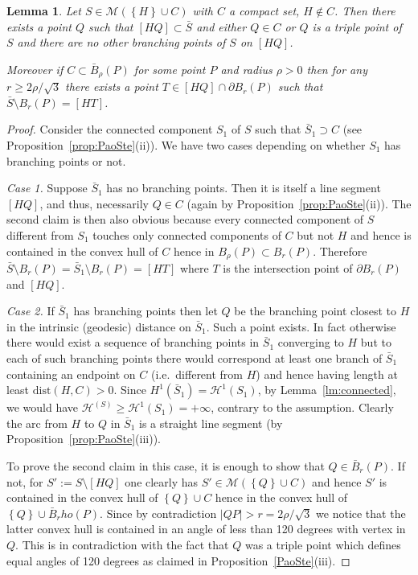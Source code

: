 \documentclass{article}
\renewcommand{\H}{\mathcal H}
\newcommand{\abs}[1]{\left\vert #1 \right\vert}
\newcommand{\ENCLOSE}[1]{\left\{#1\right\}}
\newcommand{\M}{\mathcal{M}}
\renewcommand{\H}{\mathcal{H}}
\newcommand{\dist}{\mathrm{dist}}
\newtheorem{lemma}[theorem]{Lemma}
\theoremstyle{definition}
\theoremstyle{remark}
\begin{document}
\begin{lemma}\label{lm:angle}
Let $S\in \M(\ENCLOSE{H} \cup C)$ with $C$ a compact set, $H\not \in C$.
Then there exists a point $Q$ such that $[HQ]\subset \bar S$ 
and either $Q\in C$ or $Q$ is a triple point of $S$
and there are no other branching points of $S$ on $[HQ]$.

Moreover if $C\subset \bar B_\rho(P)$ for some point $P$ and radius $\rho > 0$
then for any $r\ge 2\rho/\sqrt 3$ there exists a point 
$T\in [HQ]\cap \partial B_r(P)$ such that 
$\bar S\setminus B_r(P) = [HT]$.
\end{lemma}
%
\begin{proof}
Consider the connected component $S_1$ of $S$ such that $\bar S_1\supset C$
(see Proposition~\ref{prop:PaoSte}(ii)).
We have two cases depending on whether $S_1$ has branching points or not.

\emph{Case 1.} Suppose $\bar S_1$ has no branching points. 
Then it is itself a line 
segment $[HQ]$, and thus, necessarily $Q\in C$ 
(again by Proposition~\ref{prop:PaoSte}(ii)).
The second claim is then also obvious because every connected component 
of $S$ different from $S_1$ touches only connected components of $C$ 
but not $H$
and hence is contained in the convex hull of $C$ hence in $B_\rho(P)\subset B_r(P)$.
Therefore $\bar S\setminus B_r(P) = \bar S_1\setminus B_r(P) = [HT]$
where $T$ is the intersection point of $\partial B_r(P)$ and $[HQ]$.

\emph{Case 2.} If $\bar S_1$ has branching points
then let $Q$ be the branching point closest to $H$ 
in the intrinsic (geodesic) distance on $\bar S_1$.
Such a point exists. In fact otherwise there would exist a sequence of 
branching points in $\bar S_1$ converging to $H$
but to each of such branching points there would correspond at least 
one branch of $\bar S_1$ containing an endpoint on $C$ 
(i.e.\ different from $H$) and hence having length at least $\dist(H,C)>0$.
Since $H^1(\bar S_1)=\H^1(S_1)$, by Lemma~\ref{lm:connected}, 
we would have $\H^(S)\ge \H^1(S_1)= +\infty$, contrary to the assumption.
Clearly the arc from $H$ to $Q$ in $\bar S_1$ is a straight line segment 
(by Proposition~\ref{prop:PaoSte}(iii)).

To prove the second claim in this case, 
it is enough to show that $Q\in \bar B_r(P)$.
If not, for $S':=S\setminus [HQ]$ one clearly has $S'\in \M(\ENCLOSE{Q} \cup C)$
and hence $S'$ is contained in the convex hull of $\ENCLOSE{Q}\cup C$
hence in the convex hull of $\ENCLOSE{Q}\cup \bar B_rho(P)$.
Since by contradiction $\abs{QP}> r = 2\rho/\sqrt 3$ 
we notice that the latter convex 
hull is contained in an angle of less than 120 degrees with vertex in $Q$.
This is in contradiction with the fact that $Q$ was a triple point 
which defines equal angles of 120 degrees as claimed in Proposition~\ref{PaoSte}(iii).
\end{proof}
\end{document}
